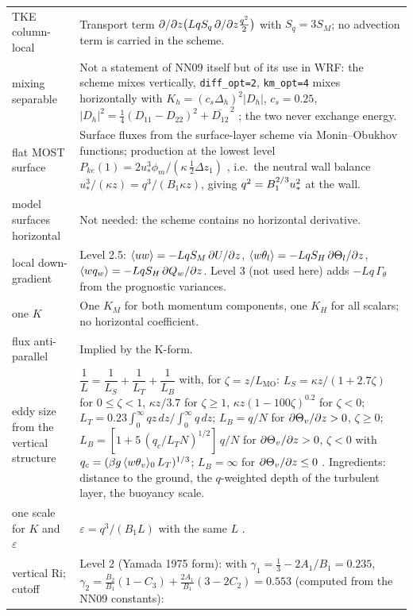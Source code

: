 \begin{xltabular}{\linewidth}{@{}>{\raggedright\arraybackslash}p{3.2cm} >{\raggedright\arraybackslash}X@{}}
 TKE column-local & Transport term $\partial /\partial z\big(L q S_q\,\partial /\partial z\tfrac{q^{2}}{2}\big)$ with $S_q = 3 S_M$; no advection term is carried in the scheme. \\
 mixing separable & Not a statement of NN09 itself but of its use in WRF: the scheme mixes vertically, \texttt{diff\_opt=2}, \texttt{km\_opt=4} mixes horizontally with $K_h = (c_s\Delta_h)^2 |D_h|$, $c_s = 0.25$, $|D_h|^2 = \tfrac14(D_{11} - D_{22})^2 + \overline{D_{12}}^{\,2}$ ; the two never exchange energy. \\
 flat MOST surface & Surface fluxes from the surface-layer scheme via Monin--Obukhov functions; production at the lowest level $P_{ke}(1) = 2 u_*^3 \phi_m/(\kappa\,\tfrac12\Delta z_1)$ , i.e.\ the neutral wall balance $u_*^3/(\kappa z) = q^3/(B_1 \kappa z)$, giving $q^{2} = B_1^{2/3} u_*^2$ at the wall. \\
 model surfaces horizontal & Not needed: the scheme contains no horizontal derivative. \\
 local down-gradient & Level 2.5: $\langle uw \rangle = -L q S_M\,\partial U/\partial z$, $\langle w\theta_l \rangle = -L q S_H\,\partial \Theta_l/\partial z$, $\langle w q_w \rangle = -L q S_H\,\partial Q_w/\partial z$. Level 3 (not used here) adds $-L q\,\Gamma_\theta$ from the prognostic variances. \\
 one $K$ & One $K_M$ for both momentum components, one $K_H$ for all scalars; no horizontal coefficient. \\
 flux anti-parallel & Implied by the K-form. \\
 eddy size from the vertical structure & $\dfrac{1}{L} = \dfrac{1}{L_S} + \dfrac{1}{L_T} + \dfrac{1}{L_B}$ with, for $\zeta = z/L_{\mathrm{MO}}$:
$L_S = \kappa z/(1 + 2.7\zeta)$ for $0 \le \zeta < 1$, $\kappa z/3.7$ for $\zeta \ge 1$, $\kappa z (1 - 100\zeta)^{0.2}$ for $\zeta < 0$;
$L_T = 0.23 \displaystyle\int_0^\infty q z\,dz \Big/ \int_0^\infty q\,dz$;
$L_B = q/N$ for $\partial \Theta_v/\partial z > 0$, $\zeta \ge 0$; $L_B = [1 + 5\,(q_c/L_T N)^{1/2}]\,q/N$ for $\partial \Theta_v/\partial z > 0$, $\zeta < 0$ with $q_c = (\beta g\,\langle w\theta_v \rangle_0\, L_T)^{1/3}$; $L_B = \infty$ for $\partial \Theta_v/\partial z \le 0$ . Ingredients: distance to the ground, the $q$-weighted depth of the turbulent layer, the buoyancy scale. \\
 one scale for $K$ and $\varepsilon$ & $\varepsilon = q^3/(B_1 L)$ with the same $L$ . \\
 vertical Ri; cutoff & Level 2 (Yamada 1975 form): with $\gamma_1 = \tfrac13 - 2A_1/B_1 = 0.235$, $\gamma_2 = \tfrac{B_2}{B_1}(1 - C_3) + \tfrac{2A_1}{B_1}(3 - 2C_2) = 0.553$ (computed from the NN09 constants):

\end{xltabular}
